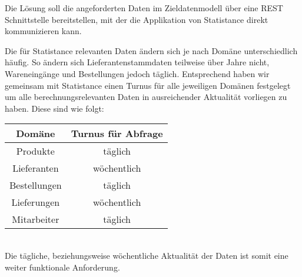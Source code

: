 Die Lösung soll die angeforderten Daten im Zieldatenmodell über eine REST Schnittstelle bereitstellen, mit der die Applikation von Statistance direkt kommunizieren kann.

Die für Statistance relevanten Daten ändern sich je nach Domäne unterschiedlich häufig. So ändern sich Lieferantenstammdaten teilweise über Jahre nicht, Wareneingänge und Bestellungen jedoch täglich.
Entsprechend haben wir gemeinsam mit Statistance einen Turnus für alle jeweiligen Domänen festgelegt um alle berechnungsrelevanten Daten in ausreichender Aktualität vorliegen zu haben. Diese sind wie folgt: 
\\\newline
\begin{tabular}{ c c  }
\hline
 Domäne & Turnus für Abfrage\\
 \hline
 Produkte & täglich  \\ 
 Lieferanten & wöchentlich  \\  
 Bestellungen & täglich  \\
 Lieferungen &  wöchentlich \\
 Mitarbeiter & täglich 
\end{tabular}
\\
\newline Die tägliche, beziehungsweise wöchentliche Aktualität der Daten ist somit eine weiter funktionale Anforderung.
